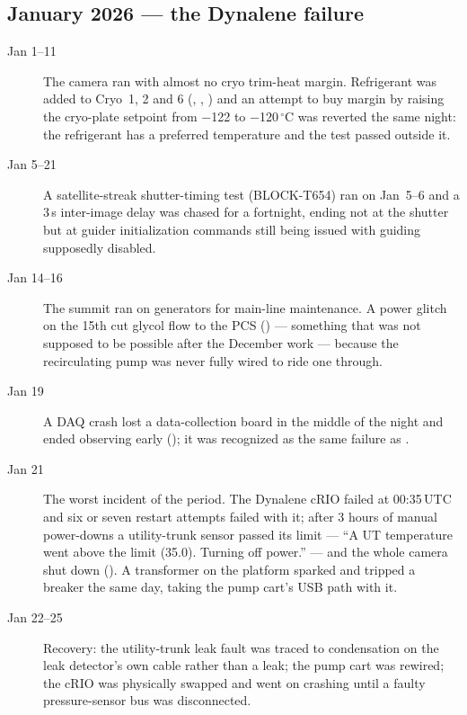 \subsection{January 2026 --- the Dynalene failure}
\begin{description}

\item[Jan 1--11] The camera ran with almost no cryo trim-heat margin.
  Refrigerant was added to Cryo~1, 2 and 6 (,
  , ) and an attempt to
  buy margin by raising the cryo-plate setpoint from $-$122 to
  $-$120\,$^{\circ}$C was reverted the same night: the refrigerant has a
  preferred temperature and the test passed outside it.

\item[Jan 5--21] A satellite-streak shutter-timing test (BLOCK-T654)
  ran on Jan~5--6 and a 3\,s inter-image delay was chased for a
  fortnight, ending not at the shutter but at guider initialization
  commands still being issued with guiding supposedly disabled.

\item[Jan 14--16] The summit ran on generators for main-line
  maintenance.  A power glitch on the 15th cut glycol flow to the PCS
  () --- something that was not supposed to be
  possible after the December work --- because the recirculating pump
  was never fully wired to ride one through.

\item[Jan 19] A DAQ crash lost a data-collection board in the middle
  of the night and ended observing early (); it was
  recognized as the same failure as .

\item[Jan 21] The worst incident of the period.  The Dynalene cRIO
  failed at 00:35\,UTC and six or seven restart attempts failed with
  it; after 3 hours of manual power-downs a utility-trunk sensor
  passed its limit --- ``A UT temperature went above the limit (35.0).
  Turning off power.'' --- and the whole camera shut down
  ().  A transformer on the platform sparked and
  tripped a breaker the same day, taking the pump cart's USB path with
  it.

\item[Jan 22--25] Recovery: the utility-trunk leak fault was traced to
  condensation on the leak detector's own cable rather than a leak; the
  pump cart was rewired; the cRIO was physically swapped and went on
  crashing until a faulty pressure-sensor bus was disconnected.


\end{description}
